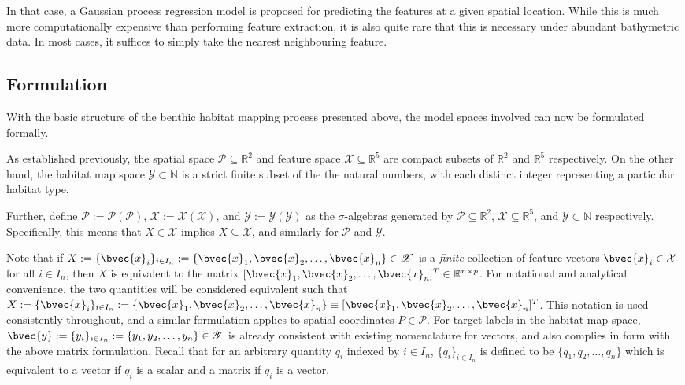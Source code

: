 		In that case, a Gaussian process regression model is proposed for predicting the features at a given spatial location. While this is much more computationally expensive than performing feature extraction, it is also quite rare that this is necessary under abundant bathymetric data. In most cases, it suffices to simply take the nearest neighbouring feature.		
		
		\subsection{Formulation}
		
			With the basic structure of the benthic habitat mapping process presented above, the model spaces involved can now be formulated formally.
			
			As established previously, the spatial space $\mathcal{P} \subseteq \mathbb{R}^{2}$ and feature space $\mathcal{X} \subseteq \mathbb{R}^{5}$ are compact subsets of $\mathbb{R}^{2}$ and $\mathbb{R}^{5}$ respectively. On the other hand, the habitat map space $\mathcal{Y} \subset \mathbb{N}$ is a strict finite subset of the the natural numbers, with each distinct integer representing a particular habitat type.
			
			Further, define $\mathscr{P} := \mathscr{P}(\mathcal{P})$, $\mathscr{X} := \mathscr{X}(\mathcal{X})$, and $\mathscr{Y} := \mathscr{Y}(\mathcal{Y})$ as the $\sigma$-algebras generated by $\mathcal{P} \subseteq \mathbb{R}^{2}$, $\mathcal{X} \subseteq \mathbb{R}^{5}$, and $\mathcal{Y} \subset \mathbb{N}$ respectively. Specifically, this means that $X \in \mathscr{X}$ implies $X \subseteq \mathcal{X}$, and similarly for $\mathscr{P}$ and $\mathscr{Y}$.
			
			Note that if $X := \{\bvec{x}_{i}\}_{i \in I_{n}} := \{\bvec{x}_{1}, \bvec{x}_{2}, \dots, \bvec{x}_{n}\} \in \mathscr{X}$ is a \textit{finite} collection of feature vectors $\bvec{x}_{i} \in \mathcal{X}$ for all $i \in I_{n}$, then $X$ is equivalent to the matrix $[\bvec{x}_{1}, \bvec{x}_{2}, \dots, \bvec{x}_{n}]^{T} \in \mathbb{R}^{n \times p}$. For notational and analytical convenience, the two quantities will be considered equivalent such that $X := \{\bvec{x}_{i}\}_{i \in I_{n}} := \{\bvec{x}_{1}, \bvec{x}_{2}, \dots, \bvec{x}_{n}\} \equiv [\bvec{x}_{1}, \bvec{x}_{2}, \dots, \bvec{x}_{n}]^{T}$. This notation is used consistently throughout, and a similar formulation applies to spatial coordinates $P \in \mathscr{P}$. For target labels in the habitat map space, $\bvec{y} := \{y_{i}\}_{i \in I_{n}} := \{y_{1}, y_{2}, \dots, y_{n}\} \in \mathscr{Y}$ is already consistent with existing nomenclature for vectors, and also complies in form with the above matrix formulation. Recall that for an arbitrary quantity $q_{i}$ indexed by $i \in I_{n}$, $\{q_{i}\}_{i \in I_{n}}$ is defined to be $\{q_{1}, q_{2}, \dots, q_{n}\}$ which is equivalent to a vector if $q_{i}$ is a scalar and a matrix if $q_{i}$ is a vector.
		
